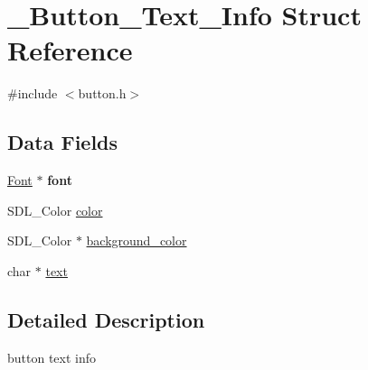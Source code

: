 \hypertarget{struct___button___text___info}{\section{\+\_\+\+Button\+\_\+\+Text\+\_\+\+Info Struct Reference}
\label{struct___button___text___info}
}


{\ttfamily \#include $<$button.\+h$>$}

\subsection*{Data Fields}
\begin{DoxyCompactItemize}
\item 
\hypertarget{struct___button___text___info_a7cd87b1eaeb9bdee7ac16121086be6b8}{\hyperlink{struct__font}{Font} $\ast$ {\bfseries font}}\label{struct___button___text___info_a7cd87b1eaeb9bdee7ac16121086be6b8}

\item 
S\+D\+L\+\_\+\+Color \hyperlink{struct___button___text___info_a631bf4babe4c1825a2cdc0c19c2bd04f}{color}
\item 
S\+D\+L\+\_\+\+Color $\ast$ \hyperlink{struct___button___text___info_a32aa566db158516db085c8abc793cf33}{background\+\_\+color}
\item 
char $\ast$ \hyperlink{struct___button___text___info_a5633b1433389cec21ade3811bbe9ca5b}{text}
\end{DoxyCompactItemize}


\subsection{Detailed Description}
button text info 

